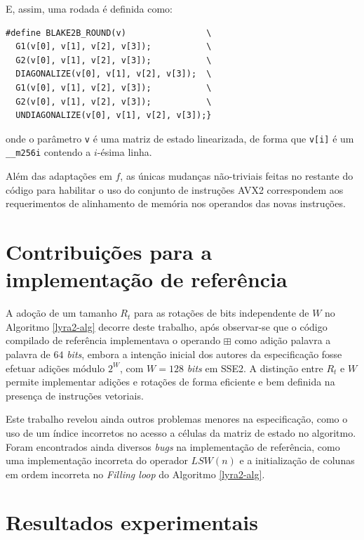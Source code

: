 \documentclass{article}
\begin{document}
E, assim, uma rodada é definida como:

\begin{small}
\begin{verbatim}
#define BLAKE2B_ROUND(v)                \
  G1(v[0], v[1], v[2], v[3]);           \
  G2(v[0], v[1], v[2], v[3]);           \
  DIAGONALIZE(v[0], v[1], v[2], v[3]);  \
  G1(v[0], v[1], v[2], v[3]);           \
  G2(v[0], v[1], v[2], v[3]);           \
  UNDIAGONALIZE(v[0], v[1], v[2], v[3]);}
\end{verbatim}
\end{small}
onde o parâmetro \texttt{v} é uma matriz de estado linearizada, de forma
que \texttt{v[i]} é um \texttt{\_\_m256i} contendo a $i$-ésima linha.

Além das adaptações em $f$, as únicas mudanças não-triviais feitas no restante
do código para habilitar o uso do conjunto de instruções AVX2 correspondem aos
requerimentos de alinhamento de memória nos operandos das novas instruções.

\section{Contribuições para a implementação de referência }
\label{sec-contribuicoes}

A adoção de um tamanho $R_{t}$ para as rotações de bits independente de $W$ no
Algoritmo \ref{lyra2-alg} decorre deste trabalho, após observar-se que o código
compilado de referência implementava o operando $\boxplus$ como adição palavra
a palavra de $64$ \emph{bits}, embora a intenção inicial dos autores da
especificação fosse efetuar adições módulo $2^{W}$, com $W = 128$ \emph{bits}
em SSE2. A distinção entre $R_{t}$ e $W$ permite implementar adições e rotações
de forma eficiente e bem definida na presença de instruções vetoriais.

Este trabalho revelou ainda outros problemas menores na especificação, como o
uso de um índice incorretos no acesso a células da matriz de estado no
algoritmo. Foram encontrados ainda diversos \emph{bugs} na implementação de
referência, como uma implementação incorreta do operador $LSW(n)$ e a
initialização de colunas em ordem incorreta no \emph{Filling loop} do Algoritmo
\ref{lyra2-alg}.

\section{Resultados experimentais }
\label{sec-experimental}
\end{document}
